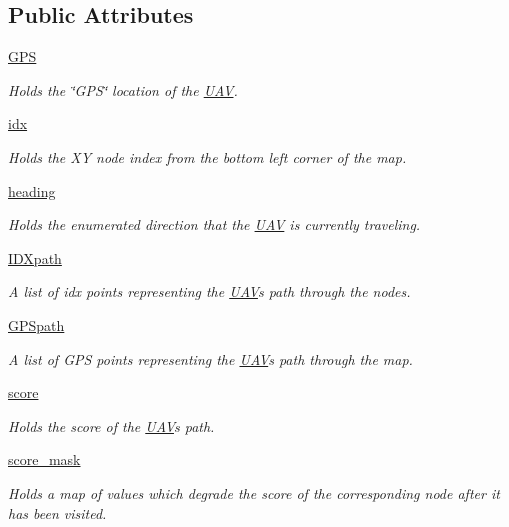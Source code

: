 \subsection*{Public Attributes}
\begin{DoxyCompactItemize}
\item 
\mbox{\hyperlink{classpath_plan_1_1_u_a_v_a759acf47734cd05447afe9e4a3f61307}{G\+PS}}
\begin{DoxyCompactList}\small\item\em Holds the \char`\"{}\+G\+P\+S\char`\"{} location of the \mbox{\hyperlink{classpath_plan_1_1_u_a_v}{U\+AV}}. \end{DoxyCompactList}\item 
\mbox{\hyperlink{classpath_plan_1_1_u_a_v_a8c6578c4b96f4704489038660a4ebe58}{idx}}
\begin{DoxyCompactList}\small\item\em Holds the XY node index from the bottom left corner of the map. \end{DoxyCompactList}\item 
\mbox{\hyperlink{classpath_plan_1_1_u_a_v_ac49fa37a2aaf8fe987f1500069c4f903}{heading}}
\begin{DoxyCompactList}\small\item\em Holds the enumerated direction that the \mbox{\hyperlink{classpath_plan_1_1_u_a_v}{U\+AV}} is currently traveling. \end{DoxyCompactList}\item 
\mbox{\hyperlink{classpath_plan_1_1_u_a_v_a640c0f9f8385d53e0742d9ef5f3a7a59}{I\+D\+Xpath}}
\begin{DoxyCompactList}\small\item\em A list of idx points representing the \mbox{\hyperlink{classpath_plan_1_1_u_a_v}{U\+AV}}\textquotesingle{}s path through the nodes. \end{DoxyCompactList}\item 
\mbox{\hyperlink{classpath_plan_1_1_u_a_v_a1d6d4797e8ac522de0da65ba882b8616}{G\+P\+Spath}}
\begin{DoxyCompactList}\small\item\em A list of G\+PS points representing the \mbox{\hyperlink{classpath_plan_1_1_u_a_v}{U\+AV}}\textquotesingle{}s path through the map. \end{DoxyCompactList}\item 
\mbox{\hyperlink{classpath_plan_1_1_u_a_v_a5f9c3173062f490e98024972e954cb1c}{score}}
\begin{DoxyCompactList}\small\item\em Holds the score of the \mbox{\hyperlink{classpath_plan_1_1_u_a_v}{U\+AV}}\textquotesingle{}s path. \end{DoxyCompactList}\item 
\mbox{\hyperlink{classpath_plan_1_1_u_a_v_a998af53f0d27f93e5ad949a09710f995}{score\+\_\+mask}}
\begin{DoxyCompactList}\small\item\em Holds a map of values which degrade the score of the corresponding node after it has been visited. \end{DoxyCompactList}\end{DoxyCompactItemize}


